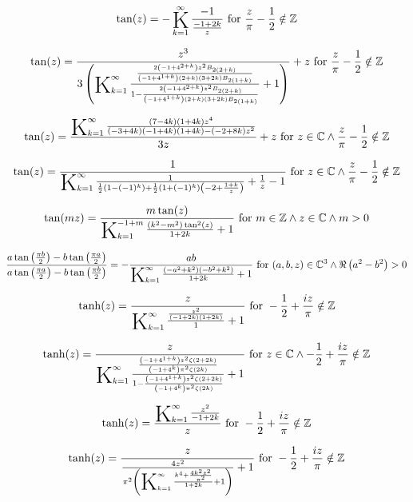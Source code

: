 \documentclass{article}
\newcommand{\bigK}{\mathop{\raisebox{-5pt}{\huge K}}}
\begin{document}
\[\tan (z)=-\bigK_{k=1}^{\infty}\frac{-1}{\frac{-1+2 k}{z}}\text{ for }\frac{z}{\pi }-\frac{1}{2}\notin \mathbb{Z}\] 

\[\tan (z)=\frac{z^3}{3 \left(\bigK_{k=1}^{\infty}\frac{\frac{2 \left(-1+4^{2+k}\right) z^2 B_{2 (2+k)}}{\left(-1+4^{1+k}\right) (2+k) (3+2 k) B_{2 (1+k)}}}{1-\frac{2 \left(-1+4^{2+k}\right) z^2 B_{2 (2+k)}}{\left(-1+4^{1+k}\right) (2+k) (3+2 k) B_{2 (1+k)}}}+1\right)}+z\text{ for }\frac{z}{\pi }-\frac{1}{2}\notin \mathbb{Z}\] 

\[\tan (z)=\frac{\bigK_{k=1}^{\infty}\frac{(7-4 k) (1+4 k) z^4}{(-3+4 k) (-1+4 k) (1+4 k)-(-2+8 k) z^2}}{3 z}+z\text{ for }z\in \mathbb{C}\land \frac{z}{\pi }-\frac{1}{2}\notin \mathbb{Z}\] 

\[\tan (z)=\frac{1}{\bigK_{k=1}^{\infty}\frac{1}{\frac{1}{2} \left(1-(-1)^k\right)+\frac{1}{2} \left(1+(-1)^k\right) \left(-2+\frac{1+k}{z}\right)}+\frac{1}{z}-1}\text{ for }z\in \mathbb{C}\land \frac{z}{\pi }-\frac{1}{2}\notin \mathbb{Z}\] 

\[\tan (m z)=\frac{m \tan (z)}{\bigK_{k=1}^{-1+m}\frac{\left(k^2-m^2\right) \tan ^2(z)}{1+2 k}+1}\text{ for }m\in \mathbb{Z}\land z\in \mathbb{C}\land m>0\] 

\[\frac{a \tan \left(\frac{\pi  b}{2}\right)-b \tan \left(\frac{\pi  a}{2}\right)}{a \tan \left(\frac{\pi  a}{2}\right)-b \tan \left(\frac{\pi  b}{2}\right)}=-\frac{a b}{\bigK_{k=1}^{\infty}\frac{\left(-a^2+k^2\right) \left(-b^2+k^2\right)}{1+2 k}+1}\text{ for }(a,b,z)\in \mathbb{C}^3\land \Re\left(a^2-b^2\right)>0\] 

\[\tanh (z)=\frac{z}{\bigK_{k=1}^{\infty}\frac{\frac{z^2}{(-1+2 k) (1+2 k)}}{1}+1}\text{ for }-\frac{1}{2}+\frac{i z}{\pi }\notin \mathbb{Z}\] 

\[\tanh (z)=\frac{z}{\bigK_{k=1}^{\infty}\frac{\frac{\left(-1+4^{1+k}\right) z^2 \zeta (2+2 k)}{\left(-1+4^k\right) \pi ^2 \zeta (2 k)}}{1-\frac{\left(-1+4^{1+k}\right) z^2 \zeta (2+2 k)}{\left(-1+4^k\right) \pi ^2 \zeta (2 k)}}+1}\text{ for }z\in \mathbb{C}\land -\frac{1}{2}+\frac{i z}{\pi }\notin \mathbb{Z}\] 

\[\tanh (z)=\frac{\bigK_{k=1}^{\infty}\frac{z^2}{-1+2 k}}{z}\text{ for }-\frac{1}{2}+\frac{i z}{\pi }\notin \mathbb{Z}\] 

\[\tanh (z)=\frac{z}{\frac{4 z^2}{\pi ^2 \left(\bigK_{k=1}^{\infty}\frac{k^4+\frac{4 k^2 z^2}{\pi ^2}}{1+2 k}+1\right)}+1}\text{ for }-\frac{1}{2}+\frac{i z}{\pi }\notin \mathbb{Z}\] 
\end{document}
